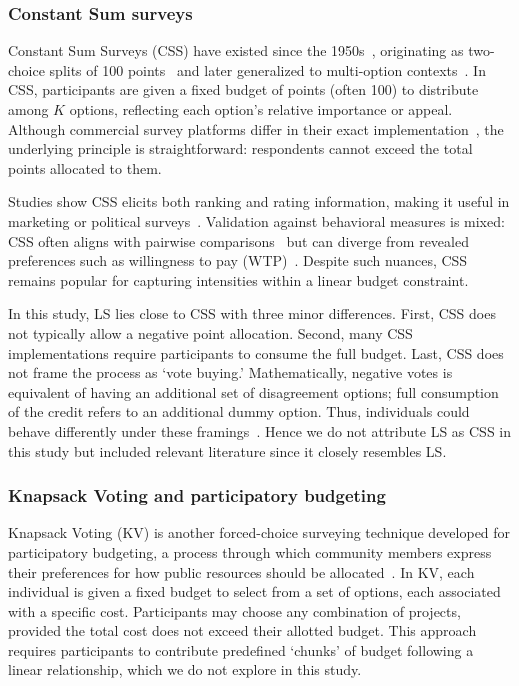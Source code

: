 \subsubsection{Constant Sum surveys}
Constant Sum Surveys (CSS) have existed since the 1950s~\cite{Malhotra_Naresh_K_2012, smithBasicMarketingResearch2013, Donald_R_Cooper2013-03-05}, originating as two-choice splits of 100 points~\cite{metfesselProposalQuantitativeReporting1947} and later generalized to multi-option contexts~\cite{zhuSelfestimationWeightParameter1991, harwoodUnderstandingImplicitExplicit2019}. In CSS, participants are given a fixed budget of points (often 100) to distribute among $K$ options, reflecting each option’s relative importance or appeal. Although commercial survey platforms differ in their exact implementation~\cite{qualtricsConstantSumQuestion2025,surveysparrowWhatConstantSum2025,lorraineConstantSumQuestion2022}, the underlying principle is straightforward: respondents cannot exceed the total points allocated to them.

Studies show CSS elicits both ranking and rating information, making it useful in marketing or political surveys~\cite{collewetPreferenceEstimationPoint2023}. Validation against behavioral measures is mixed: CSS often aligns with pairwise comparisons~\cite{dudekValidityPointAssignmentProcedure1957} but can diverge from revealed preferences such as willingness to pay (WTP)~\cite{louviereComparisonImportanceWeights2008}. Despite such nuances, CSS remains popular for capturing intensities within a linear budget constraint.

In this study, LS lies close to CSS with three minor differences. First, CSS does not typically allow a negative point allocation. Second, many CSS implementations require participants to consume the full budget. Last, CSS does not frame the process as `vote buying.'  Mathematically, negative votes is equivalent of having an additional set of disagreement options; full consumption of the credit refers to an additional dummy option. Thus, individuals could behave differently under these framings~\cite{shahScarcityFramesValue2015, kahnemanProspectTheoryAnalysis1979}. Hence we do not attribute LS as CSS in this study but included relevant literature since it closely resembles LS.

\subsubsection{Knapsack Voting and participatory budgeting}
Knapsack Voting (KV) is another forced-choice surveying technique developed for participatory budgeting, a process through which community members express their preferences for how public resources should be allocated~\cite{goelKnapsackVotingParticipatory2019, goel2016budget}. In KV, each individual is given a fixed budget to select from a set of options, each associated with a specific cost. Participants may choose any combination of projects, provided the total cost does not exceed their allotted budget. This approach requires participants to contribute predefined `chunks' of budget following a linear relationship, which we do not explore in this study.

